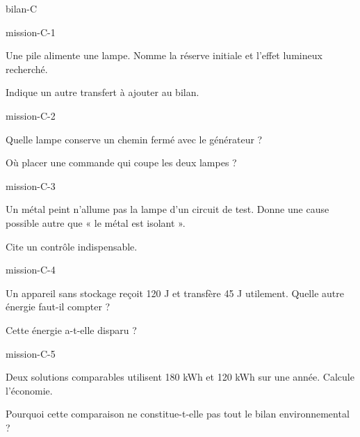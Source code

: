 \documentclass[12pt,twoside,openany]{book}
\begin{document}
\label{bilan-C}
\begin{pcFiche}{bilan-C}
\begin{blocLivre}{mission-C-1}
\begin{questions}
\item Une pile alimente une lampe. Nomme la réserve initiale et l’effet lumineux recherché.
\item Indique un autre transfert à ajouter au bilan.
\end{questions}
\end{blocLivre}
\begin{blocLivre}{mission-C-2}
\begin{questions}
\item Quelle lampe conserve un chemin fermé avec le générateur ?
\item Où placer une commande qui coupe les deux lampes ?
\end{questions}
\end{blocLivre}
\begin{blocLivre}{mission-C-3}
\begin{questions}
\item Un métal peint n’allume pas la lampe d’un circuit de test. Donne une cause possible autre que « le métal est isolant ».
\item Cite un contrôle indispensable.
\end{questions}
\end{blocLivre}
\begin{blocLivre}{mission-C-4}
\begin{questions}
\item Un appareil sans stockage reçoit 120 J et transfère 45 J utilement. Quelle autre énergie faut-il compter ?
\item Cette énergie a-t-elle disparu ?
\end{questions}
\end{blocLivre}
\begin{blocLivre}{mission-C-5}
\begin{questions}
\item Deux solutions comparables utilisent 180 kWh et 120 kWh sur une année. Calcule l’économie.
\item Pourquoi cette comparaison ne constitue-t-elle pas tout le bilan environnemental ?
\end{questions}
\end{blocLivre}
\end{pcFiche}
\end{document}
